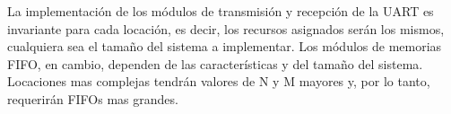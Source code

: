 	La implementación de los módulos de transmisión y recepción de la UART es invariante para cada locación, es decir, los recursos asignados serán los mismos, cualquiera sea el tamaño del sistema a implementar. Los módulos de memorias FIFO, en cambio, dependen de las características y del tamaño del sistema. Locaciones mas complejas tendrán valores de N y M mayores y, por lo tanto, requerirán FIFOs mas grandes. 
	
